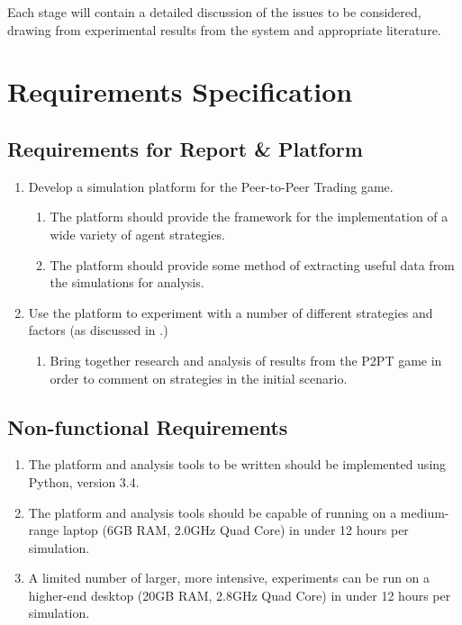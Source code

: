 \documentclass{article}
\begin{document}
Each stage will contain a detailed discussion of the issues to be considered, drawing from experimental results from the system and appropriate literature.

\section{Requirements Specification}
\label{sec:requirements-spec}
\subsection{Requirements for Report \& Platform}
\begin{enumerate}
	\item Develop a simulation platform for the Peer-to-Peer Trading game.
	\begin{enumerate}
		\item The platform should provide the framework for the implementation of a wide variety of agent strategies.
		\item The platform should provide some method of extracting useful data from the simulations for analysis.
	\end{enumerate}
	\item Use the platform to experiment with a number of different strategies and factors (as discussed in .)
	\begin{enumerate}
		\item Bring together research and analysis of results from the P2PT game in order to comment on strategies in the initial scenario.
	\end{enumerate}
\end{enumerate}

\subsection{Non-functional Requirements}
\label{sec:non-functional}
\begin{enumerate}
	\item The platform and analysis tools to be written should be implemented using Python, version 3.4.
	\item The platform and analysis tools should be capable of running on a medium-range laptop (6GB RAM, 2.0GHz Quad Core) in under 12 hours per simulation.
	\item A limited number of larger, more intensive, experiments can be run on a higher-end desktop (20GB RAM, 2.8GHz Quad Core) in under 12 hours per simulation.
\end{enumerate}
\end{document}
